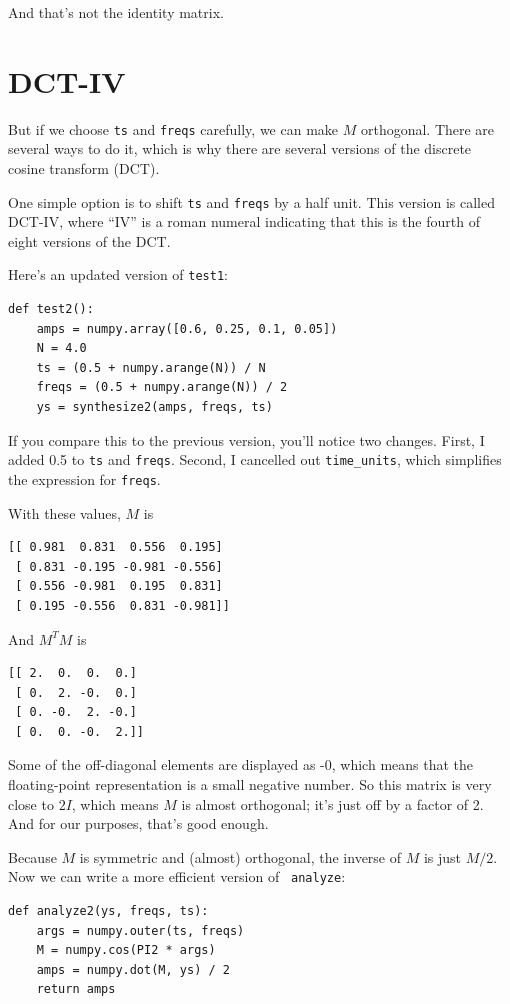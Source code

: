 \documentclass[12pt]{book}
\begin{document}
And that's not the identity matrix.


\section{DCT-IV}

But if we choose {\tt ts} and {\tt freqs} carefully,
we can make $M$ orthogonal.  There are several ways to do it, which
is why there are several versions of the discrete cosine transform (DCT).

One simple option is to shift {\tt ts} and {\tt freqs} by a half unit.
This version is called DCT-IV, where ``IV'' is a roman numeral
indicating that this is the fourth of eight versions of the DCT.

Here's an updated version of {\tt test1}:

\begin{verbatim}
def test2():
    amps = numpy.array([0.6, 0.25, 0.1, 0.05])
    N = 4.0
    ts = (0.5 + numpy.arange(N)) / N
    freqs = (0.5 + numpy.arange(N)) / 2
    ys = synthesize2(amps, freqs, ts)
\end{verbatim}

If you compare this to the previous version, you'll notice
two changes.  First, I added 0.5 to {\tt ts} and {\tt freqs}.
Second, I cancelled out \verb"time_units", which simplifies
the expression for {\tt freqs}.

With these values, $M$ is

\begin{verbatim}
[[ 0.981  0.831  0.556  0.195]
 [ 0.831 -0.195 -0.981 -0.556]
 [ 0.556 -0.981  0.195  0.831]
 [ 0.195 -0.556  0.831 -0.981]]
\end{verbatim}

And $M^TM$ is

\begin{verbatim}
[[ 2.  0.  0.  0.]
 [ 0.  2. -0.  0.]
 [ 0. -0.  2. -0.]
 [ 0.  0. -0.  2.]]
\end{verbatim}

Some of the off-diagonal elements are displayed as -0, which means
that the floating-point representation is a small negative number.  So
this matrix is very close to $2I$, which means $M$ is almost
orthogonal; it's just off by a factor of 2.  And for our purposes,
that's good enough.

Because $M$ is symmetric and (almost) orthogonal, the inverse of $M$
is just $M/2$.  Now we can write a more efficient version of {\tt
  analyze}:

\begin{verbatim}
def analyze2(ys, freqs, ts):
    args = numpy.outer(ts, freqs)
    M = numpy.cos(PI2 * args)
    amps = numpy.dot(M, ys) / 2
    return amps
\end{verbatim}
\end{document}
